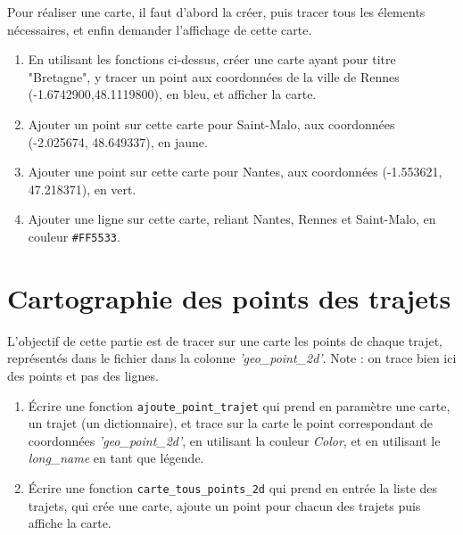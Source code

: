 \documentclass[11pt,a4paper]{article}
\begin{document}
\vspace{1em}
Pour réaliser une carte, il faut d'abord la créer, puis tracer tous les élements nécessaires, et enfin demander l'affichage de cette carte.

\begin{enumerate}
\item En utilisant les fonctions ci-dessus, créer une carte ayant pour titre "Bretagne", y tracer un point aux coordonnées de la ville de Rennes (-1.6742900,48.1119800), en bleu, et afficher la carte.
\item Ajouter un point sur cette carte pour Saint-Malo, aux coordonnées (-2.025674, 48.649337), en jaune.
\item Ajouter une point sur cette carte pour Nantes, aux coordonnées (-1.553621, 47.218371), en vert.
\item Ajouter une ligne sur cette carte, reliant Nantes, Rennes et Saint-Malo, en couleur \verb+#FF5533+.
\end{enumerate}

\section{Cartographie des points des trajets}
L'objectif de cette partie est de tracer sur une carte les points de chaque trajet, représentés dans le fichier dans la colonne \emph{'geo\_point\_2d'}. Note : on trace bien ici des points et pas des lignes.

\begin{enumerate}
    \item Écrire une fonction \verb+ajoute_point_trajet+ qui prend en paramètre une carte, un trajet (un dictionnaire), et trace sur la carte le point 
    correspondant de coordonnées \emph{'geo\_point\_2d'}, en utilisant la couleur \emph{Color}, et en utilisant le \emph{long\_name} en tant que légende.
    \item Écrire une fonction \verb+carte_tous_points_2d+ qui prend en entrée la liste des trajets, qui crée une carte, ajoute un point pour chacun des trajets puis affiche la carte.
\end{enumerate}
\end{document}
